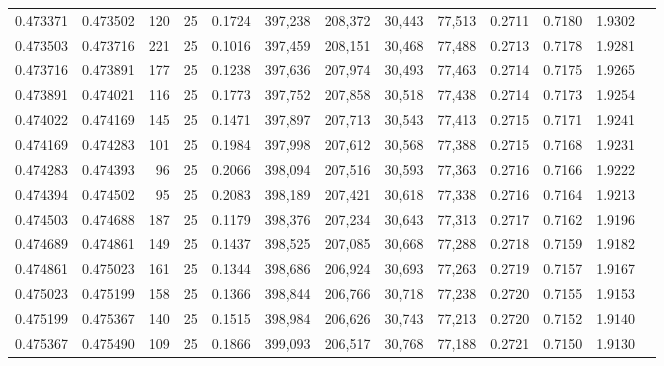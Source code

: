 \begin{tabular}{rrrrrrrrrrrrr}
0.473371 & 0.473502 &   120 &  25 &                                     0.1724 & 397,238 & 208,372 &  30,443 &  77,513 & 0.2711 & 0.7180 & 1.9302 \\
0.473503 & 0.473716 &   221 &  25 &                                     0.1016 & 397,459 & 208,151 &  30,468 &  77,488 & 0.2713 & 0.7178 & 1.9281 \\
0.473716 & 0.473891 &   177 &  25 &                                     0.1238 & 397,636 & 207,974 &  30,493 &  77,463 & 0.2714 & 0.7175 & 1.9265 \\
0.473891 & 0.474021 &   116 &  25 &                                     0.1773 & 397,752 & 207,858 &  30,518 &  77,438 & 0.2714 & 0.7173 & 1.9254 \\
0.474022 & 0.474169 &   145 &  25 &                                     0.1471 & 397,897 & 207,713 &  30,543 &  77,413 & 0.2715 & 0.7171 & 1.9241 \\
0.474169 & 0.474283 &   101 &  25 &                                     0.1984 & 397,998 & 207,612 &  30,568 &  77,388 & 0.2715 & 0.7168 & 1.9231 \\
0.474283 & 0.474393 &    96 &  25 &                                     0.2066 & 398,094 & 207,516 &  30,593 &  77,363 & 0.2716 & 0.7166 & 1.9222 \\
0.474394 & 0.474502 &    95 &  25 &                                     0.2083 & 398,189 & 207,421 &  30,618 &  77,338 & 0.2716 & 0.7164 & 1.9213 \\
0.474503 & 0.474688 &   187 &  25 &                                     0.1179 & 398,376 & 207,234 &  30,643 &  77,313 & 0.2717 & 0.7162 & 1.9196 \\
0.474689 & 0.474861 &   149 &  25 &                                     0.1437 & 398,525 & 207,085 &  30,668 &  77,288 & 0.2718 & 0.7159 & 1.9182 \\
0.474861 & 0.475023 &   161 &  25 &                                     0.1344 & 398,686 & 206,924 &  30,693 &  77,263 & 0.2719 & 0.7157 & 1.9167 \\
0.475023 & 0.475199 &   158 &  25 &                                     0.1366 & 398,844 & 206,766 &  30,718 &  77,238 & 0.2720 & 0.7155 & 1.9153 \\
0.475199 & 0.475367 &   140 &  25 &                                     0.1515 & 398,984 & 206,626 &  30,743 &  77,213 & 0.2720 & 0.7152 & 1.9140 \\
0.475367 & 0.475490 &   109 &  25 &                                     0.1866 & 399,093 & 206,517 &  30,768 &  77,188 & 0.2721 & 0.7150 & 1.9130 \\

\end{tabular}
